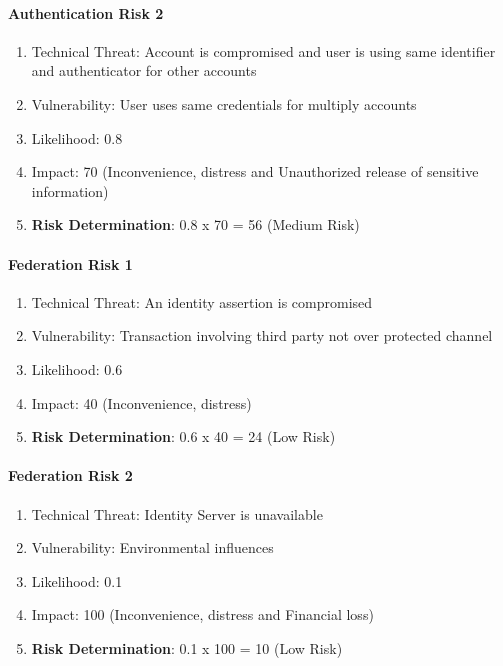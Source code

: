 \paragraph{Authentication Risk 2}
\begin{enumerate}
	\item Technical Threat: Account is compromised and user is using same identifier and authenticator for other accounts
	\item Vulnerability: User uses same credentials for multiply accounts
	\item Likelihood: 0.8
	\item Impact: 70 (Inconvenience, distress and Unauthorized release of sensitive information)
	\item \textbf{Risk Determination}: 0.8 x 70 = 56 (Medium Risk)
\end{enumerate}

\paragraph{Federation Risk 1 }
\begin{enumerate}
	\item Technical Threat: An identity assertion is compromised
	\item Vulnerability: Transaction involving third party not over protected channel
	\item Likelihood: 0.6
	\item Impact: 40 (Inconvenience, distress)
	\item \textbf{Risk Determination}: 0.6 x 40 = 24 (Low Risk)
\end{enumerate}

\paragraph{Federation Risk 2 }
\begin{enumerate}
	\item Technical Threat: Identity Server is unavailable
	\item Vulnerability: Environmental influences 
	\item Likelihood: 0.1
	\item Impact: 100 (Inconvenience, distress and Financial loss)
	\item \textbf{Risk Determination}: 0.1 x 100 = 10 (Low Risk)
\end{enumerate}


